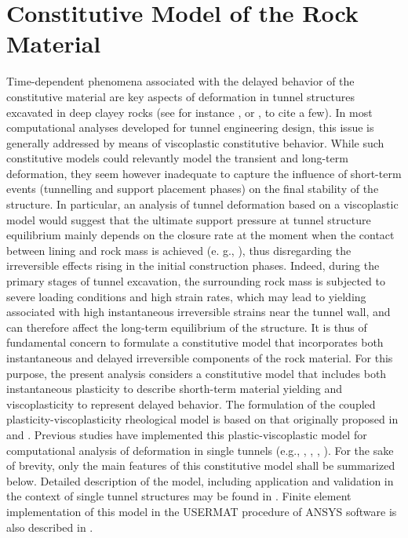 \documentclass[Journal,letterpaper, NoLists,SectionNumbers]{ascelike-new}
\begin{document}
\section{Constitutive Model of the Rock Material}\label{sec3}

Time-dependent phenomena associated with the delayed behavior of the constitutive material are key aspects of deformation in tunnel structures excavated in deep clayey rocks (see for instance ,  or , to cite a few). In most computational analyses developed for tunnel engineering design, this issue is generally addressed by means of viscoplastic constitutive behavior. While such constitutive models could relevantly model the transient and long-term deformation, they seem however inadequate to capture the influence of short-term events (tunnelling and support placement phases) on the final stability of the structure. In particular, an analysis of tunnel deformation based on a viscoplastic model would suggest that the ultimate support pressure at tunnel structure equilibrium mainly depends on the closure rate at the moment when the contact between lining and rock mass is achieved (e. g., ), thus disregarding the irreversible effects rising in the initial construction phases. Indeed, during the primary stages of tunnel excavation, the surrounding rock mass is subjected to severe loading conditions and high strain rates, which may lead to yielding associated with high instantaneous irreversible strains near the tunnel wall, and can therefore affect the long-term equilibrium of the structure. It is thus of fundamental concern to formulate a constitutive model that incorporates both instantaneous and delayed irreversible components of the rock material. For this purpose, the present analysis considers a constitutive model that includes both instantaneous plasticity to describe shorth-term material yielding and viscoplasticity to represent delayed behavior. The formulation of the coupled plasticity-viscoplasticity rheological model is based on that originally proposed in  and . Previous studies have implemented this plastic-viscoplastic model for computational analysis of deformation in single tunnels (e.g., , , , ). For the sake of brevity, only the main features of this constitutive model shall be summarized below.  Detailed description of the model, including application and validation in the context of single tunnel structures may be found in . Finite element implementation of this model in the USERMAT procedure of  ANSYS software is also described in .
\end{document}

